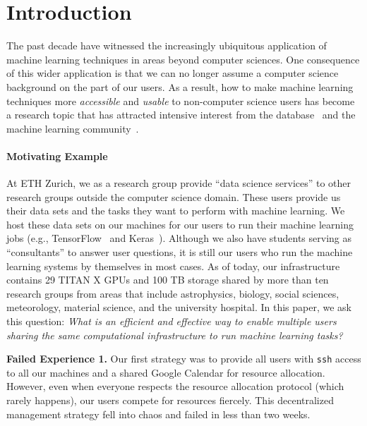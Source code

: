 \documentclass[letterpaper]{vldb}
\begin{document}
\section{Introduction}\label{sec:introduction}

The past decade have witnessed the increasingly 
ubiquitous application of machine learning techniques 
in areas beyond computer sciences. 
One consequence of this wider application
is that we can no longer assume a computer science 
background on the part of our users. As a result, how to make
machine learning techniques more {\em accessible} and
{\em usable} to non-computer science users has become
a research topic that has attracted intensive interest
from the database~\cite{XXX,XXX,XXX,XXX,XXX}
and the machine learning community~\cite{XXX,XXX,XXX,XXX,XXX}.

\paragraph*{Motivating Example} At ETH Zurich,
we as a research group provide ``data science
services'' to other research groups outside the computer science domain.
These users provide
us their data sets and the tasks they 
want to perform with machine learning. We host these data sets on our machines
for our users to run their machine learning
jobs (e.g.,
TensorFlow~\cite{XXX} and Keras~\cite{XXX}).
Although we also have students serving as ``consultants''
to answer user questions, it is still our
users who run the machine learning systems
by themselves in most cases. As of today, our infrastructure
contains 29 TITAN X GPUs and 100 TB storage
shared by more than ten research groups
from areas that include astrophysics,
biology, social sciences, meteorology, 
material science, and the university hospital.
In this paper, we ask this question: {\em What is an
efficient and effective way to enable multiple users sharing 
the same computational infrastructure to run
machine learning tasks?}

\vspace{0.3em}
\noindent
{\bf Failed Experience 1.} Our first strategy was to provide
all users with \texttt{ssh} access to all our machines
and a shared Google Calendar for resource allocation.
However, even when everyone respects the resource allocation
protocol (which rarely happens), our users compete for 
resources fiercely. This decentralized management strategy fell into chaos and failed in less than two weeks. 
\end{document}
